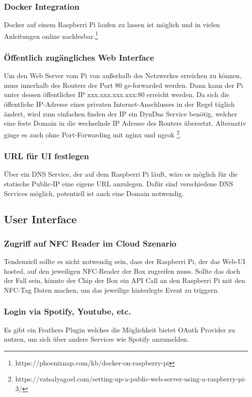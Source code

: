 \documentclass[10pt, a4paper, draft]{article}
\begin{document}
\subsubsection{Docker Integration}
Docker auf einem Raspberri Pi laufen zu lassen ist möglich und in vielen Anleitungen online nachlesbar.\footnote{https://phoenixnap.com/kb/docker-on-raspberry-pi}

\subsubsection{Öffentlich zugängliches Web Interface}
Um den Web Server vom Pi von außerhalb des Netzwerkes erreichen zu können, muss innerhalb des Routers der Port 80 ge-forwarded werden.
Dann kann der Pi unter dessen öffentlicher IP xxx.xxx.xxx.xxx:80 erreicht werden.
Da sich die öffentliche IP-Adresse eines privaten Internet-Anschlusses in der Regel täglich ändert, wird zum einfachen finden der IP ein DynDns Service benötig, welcher eine feste Domain in die wechselnde IP Adresse des Routers übersetzt.
Alternativ ginge es auch ohne Port-Forwarding mit nginx und ngrok \footnote{https://vatsalyagoel.com/setting-up-a-public-web-server-using-a-raspberry-pi-3/}.

\subsubsection{URL für UI festlegen}
Über ein DNS Service, der auf dem Raspberri Pi läuft, wäre es möglich für die statische Public-IP eine eigene URL anzulegen.
Dafür sind verschiedene DNS Services möglich, potentiell ist auch eine Domain notwendig.

\subsection{User Interface}
\subsubsection{Zugriff auf NFC Reader im Cloud Szenario}
Tendenziell sollte es nicht notwendig sein, dass der Raspberri Pi, der das Web-UI hosted, auf den jeweiligen NFC-Reader der Box zugreifen muss.
Sollte das doch der Fall sein, könnte der Chip der Box ein API Call an den Raspberri Pi mit den NFC-Tag Daten machen, um das jeweilige hinterlegte Event zu triggern.

\subsubsection{Login via Spotify, Youtube, etc.}
Es gibt ein Feathers Plugin welches die Möglichkeit bietet OAuth Provider zu nutzen, um sich über andere Services wie Spotify anzumelden.
\end{document}
